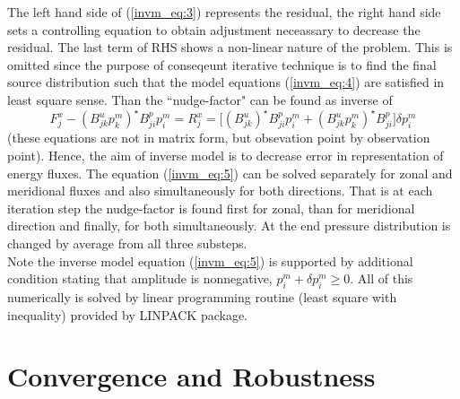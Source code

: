 The left hand side of (\ref{invm_eq:3}) represents the residual, the right hand side sets a controlling equation to obtain adjustment neceassary to decrease the residual. The last term of RHS shows a non-linear nature of the problem. This is omitted since the purpose of conseqeunt iterative technique is to find the final source distribution such that the model equations (\ref{invm_eq:4}) are satisfied in least square sense. Than the ``nudge-factor" can be found as inverse of 
\begin{equation}
F_{j}^x - (B^u_{jk} p^m_k)^{\star} B^p_{ji}{p^m_i} = R_j^x = \Big[ (B^u_{jk} )^{\star} B^p_{ji} p^m_i + (B^u_{jk} p^m_k)^{\star} B^p_{ji} \Big] \delta p^m_i \label{invm_eq:5}
\end{equation}
(these equations are not in matrix form, but obsevation point by observation point).
Hence, the aim of inverse model is to decrease error in representation of energy fluxes. The equation (\ref{invm_eq:5}) can be solved separately for zonal and meridional fluxes and also simultaneously for both directions. That is at each iteration step the nudge-factor is found first for zonal, than for meridional direction and finally, for both simultaneously. At the end pressure distribution is changed by average from all three substeps.\\
Note the inverse model equation (\ref{invm_eq:5}) is supported by additional condition stating that amplitude is nonnegative, $p_i^m + \delta p_i^m \geq 0$. All of this numerically is solved by linear programming routine  (least square with inequality) provided by LINPACK package.

\section{Convergence and Robustness}
